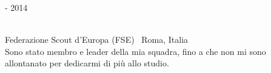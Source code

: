 \bigskip

\begin{minipage}{.3\textwidth}
	 - 2014 \faCalendar
\end{minipage}
\hfill
\begin{minipage}{.64\textwidth}
	\vfill
	 \\
	\color{Maroon} Federazione Scout d'Europa (FSE) \color{Sepia} \hfill \faMapMarker \ Roma, Italia
	\smallskip
	\\
	\color{gray} Sono stato membro e leader della mia squadra, fino a che non mi sono allontanato per dedicarmi di più allo studio.
	\vfill
\end{minipage}

